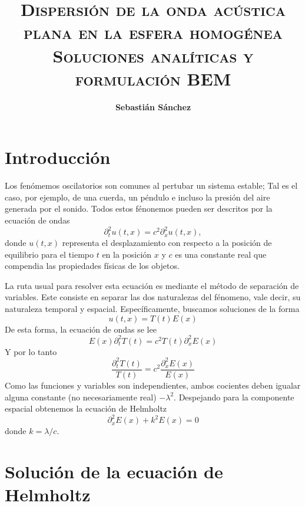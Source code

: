 \documentclass[11pt]{article}
\title%
{\bfseries\scshape%
Dispersión de la onda acústica plana en la esfera homogénea\\
\normalsize Soluciones analíticas y formulación BEM
}
\author{\bfseries\normalsize Sebastián Sánchez}
\date{}
\numberwithin{equation}{section}
\begin{document}
\maketitle

\tableofcontents

\section{Introducción}

Los fenómemos oscilatorios son comunes al pertubar un sistema estable;
Tal es el caso, por ejemplo, de una cuerda, un péndulo e incluso la presión 
del aire generada por el sonido. Todos estos fénonemos pueden ser descritos por
la ecuación de ondas
\begin{displaymath}
	\partial^2_{t} u(t,x) = c^2 \partial^2_{x} u(t,x),
\end{displaymath}
donde \(u(t,x)\) representa el desplazamiento con respecto a la posición de
equilibrio para el tiempo \(t\) en la posición \(x\) y \(c\) es una constante
real que compendia las propiedades físicas de los objetos.

La ruta usual para resolver esta ecuación es mediante el método de separación de
variables. Este consiste en separar las dos naturalezas del fénomeno, vale
decir, su naturaleza temporal y espacial. Específicamente, buscamos soluciones
de la forma
\begin{displaymath}
	u(t,x) = T(t) E(x)
\end{displaymath}
De esta forma, la ecuación de ondas se lee
\begin{displaymath}
	E(x) \partial^2_{t} T(t) = c^2 T(t) \partial^2_{x} E(x)
\end{displaymath}
Y por lo tanto
\begin{displaymath}
	\frac{\partial^2_{t} T(t)}{T(t)} 
	= 
	c^2 \frac{\partial^2_{x} E(x)}{E(x)} 
\end{displaymath}
Como las funciones y variables son independientes, ambos cocientes deben igualar
alguna constante (no necesariamente real) \(-\lambda^2\). Despejando para la componente espacial
obtenemos la ecuación de Helmholtz
\begin{displaymath}
	\partial^2_{x} E(x) + k^2 E(x) = 0
\end{displaymath}
donde \(k = \lambda / c\).

\section{Solución de la ecuación de Helmholtz}
\label{sec:helmholtz}
\end{document}

